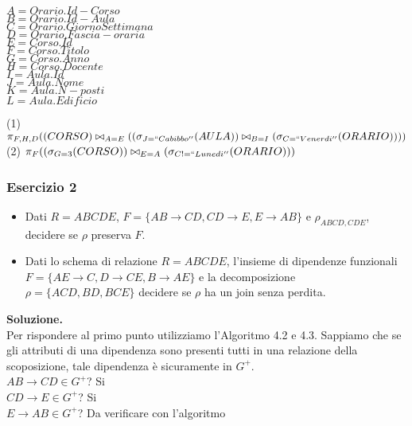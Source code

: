   \begin{multicols}{3}
  \begin{flushleft}
   $A = Orario.Id-Corso$\\
   $B = Orario.Id-Aula$\\
   $C = Orario.GiornoSettimana$\\
   $D = Orario.Fascia-oraria$\\
   $E = Corso.Id$\\
   $F = Corso.Titolo$\\
   $G = Corso.Anno$\\
   $H = Corso.Docente$\\
   $I = Aula.Id$\\
   $J = Aula.Nome$\\
   $K = Aula.N-posti$\\
   $L = Aula.Edificio$\\
  \end{flushleft}
  \end{multicols}

 \noindent(1) $\pi_{F, H, D}((CORSO)\bowtie_{A=E}((\sigma_{J=``Cabibbo''}(AULA))\bowtie_{B=I}(\sigma_{C=``Venerdi''}(ORARIO))))$\\
 (2) $\pi_{F}((\sigma_{G=3}(CORSO))\bowtie_{E=A}(\sigma_{C!=``Lunedi''}(ORARIO)))$\\

  \subsubsection{Esercizio 2}
 
 \begin{itemize}
  \item Dati $R=ABCDE$, $F=\{AB\rightarrow CD, CD\rightarrow E, E\rightarrow AB\}$ e $\rho_{ABCD, CDE}$, decidere se $\rho$
  preserva $F$.
  \item Dati lo schema di relazione $R=ABCDE$, l'insieme di dipendenze funzionali $F=\{AE\rightarrow C, D\rightarrow CE, B\rightarrow AE\}$
  e la decomposizione $\rho =\{ACD, BD, BCE\}$ decidere se $\rho$ ha un join senza perdita. 
 \end{itemize}
 
 \noindent\textbf{\fontsize{14pt}{1em}Soluzione.}\\
 Per rispondere al primo punto utilizziamo l'Algoritmo 4.2 e 4.3. Sappiamo che se gli attributi di una dipendenza sono presenti
 tutti in una relazione della scoposizione, tale dipendenza è sicuramente in $G^+$.\\
 $AB\rightarrow CD \in G^+$? Si\\
 $CD\rightarrow E \in G^+$? Si\\
 $E\rightarrow AB \in G^+$? Da verificare con l'algoritmo\\
 
